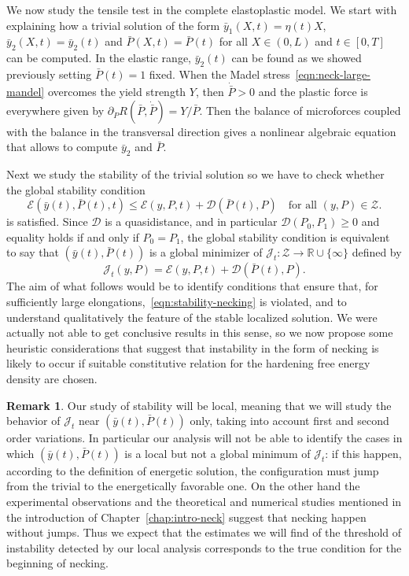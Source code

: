 \documentclass[a4paper,10pt,oneside]{amsbook}
\numberwithin{section}{chapter}
\numberwithin{equation}{chapter}
\theoremstyle{definition}
\newtheorem{rmk}[prop]{Remark}
\begin{document}
We now study the tensile test in the complete elastoplastic model. We start with explaining how a trivial solution of the form $\bar{y}_1(X,t)=\eta(t)X$, $\bar{y}_2(X,t)=\bar{y}_2(t)$ and $\bar P(X,t)=\bar{P}(t)$ for all $X\in(0,L)$ and $t\in[0,T]$ can be computed. In the elastic range, $\bar y_2(t)$ can be found as we showed previously setting $\bar P(t)=1$ fixed. When the Madel stress~\eqref{eqn:neck-large-mandel} overcomes the yield strength $Y$, then $\dot{\bar P}>0$ and the plastic force is everywhere given by $\partial_{\dot P}R(\bar P,\dot{\bar P})=Y/\bar P$. Then the balance of microforces coupled with the balance in the transversal direction gives a nonlinear algebraic equation that allows to compute $\bar y_2$ and $\bar P$.

Next we study the stability of the trivial solution so we have to check whether the global stability condition
\begin{equation}
\label{eqn:stability-necking}
\mathcal{E}(\bar{y}(t),\bar{P}(t),t)\le\mathcal{E}(y,P,t)+\mathcal{D}(\bar{P}(t),P)\quad\text{for all $(y,P)\in\mathscr{Z}$}.
\end{equation}
is satisfied. Since $\mathcal{D}$ is a quasidistance, and in particular $\mathcal{D}(P_0,P_1)\ge0$ and equality holds if and only if $P_0=P_1$, the global stability condition is equivalent to say that $(\bar y(t),\bar P(t))$ is a global minimizer of $\mathcal{J}_t\colon\mathscr{Z}\to\mathbb{R}\cup\{\infty\}$ defined by
\[
\mathcal{J}_t(y,P)=\mathcal{E}(y,P,t)+\mathcal{D}(\bar P(t),P).
\]
The aim of what follows would be to identify conditions that ensure that, for sufficiently large elongations,~\eqref{eqn:stability-necking} is violated, and to understand qualitatively the feature of the stable localized solution. We were actually not able to get conclusive results in this sense, so we now propose some heuristic considerations that suggest that instability in the form of necking is likely to occur if suitable constitutive relation for the hardening free energy density are chosen.
\begin{rmk}
Our study of stability will be local, meaning that we will study the behavior of $\mathcal{J}_t$ near $(\bar{y}(t),\bar{P}(t))$ only, taking into account first and second order variations. In particular our analysis will not be able to identify the cases in which $(\bar{y}(t),\bar{P}(t))$ is a local but not a global minimum of $\mathcal{J}_t$: if this happen, according to the definition of energetic solution, the configuration must jump from the trivial to the energetically favorable one. On the other hand the experimental observations and the theoretical and numerical studies mentioned in the introduction of Chapter~\ref{chap:intro-neck} suggest that necking happen without jumps. Thus we expect that the estimates we will find of the threshold of instability detected by our local analysis corresponds to the true condition for the beginning of necking.
\end{rmk}
\end{document}
